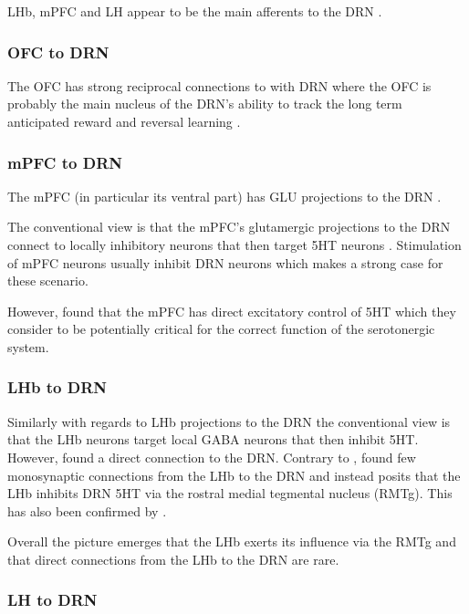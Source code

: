 \documentclass[12pt,a4paper]{article}
\begin{document}
LHb, mPFC and LH appear to be the main afferents to the DRN \citep{Vertes2010} \citep{Sparta2014} \citep{Lee2003}.

\subsubsection{OFC to DRN}

The OFC has strong reciprocal connections to with DRN \citep{Zhou2015} where the OFC is probably the main nucleus of the DRN's ability to track the long term anticipated reward and reversal learning \citep{Roberts2011}.

\subsubsection{mPFC to DRN}

The mPFC (in particular its ventral part) has GLU projections to the DRN \citep{Goncalves2009} \citep{Lee2003}.

The conventional view is that the mPFC’s glutamergic projections to the DRN connect to locally inhibitory neurons that then target 5HT neurons \citep{Celada2001}. Stimulation of mPFC neurons usually inhibit DRN neurons which makes a strong case for these scenario.

However, \citep{PollakDorocic2014} found that the mPFC has direct excitatory control of 5HT which they consider to be potentially critical for the correct function of the serotonergic system. 

\subsubsection{LHb to DRN}

Similarly with regards to LHb projections to the DRN the conventional view is that the LHb neurons
target local GABA neurons that then inhibit 5HT. However, \citep{PollakDorocic2014} found a direct connection to the DRN. Contrary to \citep{PollakDorocic2014}, \citep{Ogawa2014} found few monosynaptic connections from the LHb to the DRN and instead posits that the LHb inhibits DRN 5HT via the rostral medial tegmental nucleus (RMTg). This has also been confirmed by \citep{Sego2014}.

Overall the picture emerges that the LHb exerts its influence via the RMTg and that direct connections from the LHb to the DRN are rare.

\subsubsection{LH to DRN}
\end{document}
